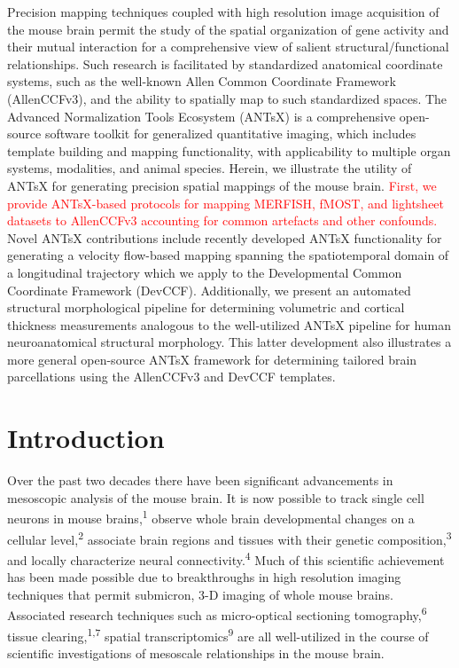 \documentclass[
  12pt,
]{article}
\begin{document}
Precision mapping techniques coupled with high resolution image
acquisition of the mouse brain permit the study of the spatial
organization of gene activity and their mutual interaction for a
comprehensive view of salient structural/functional relationships. Such
research is facilitated by standardized anatomical coordinate systems,
such as the well-known Allen Common Coordinate Framework (AllenCCFv3),
and the ability to spatially map to such standardized spaces. The
Advanced Normalization Tools Ecosystem (ANTsX) is a comprehensive
open-source software toolkit for generalized quantitative imaging, which
includes template building and mapping functionality, with applicability
to multiple organ systems, modalities, and animal species. Herein, we
illustrate the utility of ANTsX for generating precision spatial
mappings of the mouse brain.
\textcolor{red}{First, we provide ANTsX-based protocols for mapping
MERFISH, fMOST, and lightsheet datasets to AllenCCFv3 accounting for common
artefacts and other confounds.} Novel ANTsX contributions include
recently developed ANTsX functionality for generating a velocity
flow-based mapping spanning the spatiotemporal domain of a longitudinal
trajectory which we apply to the Developmental Common Coordinate
Framework (DevCCF). Additionally, we present an automated structural
morphological pipeline for determining volumetric and cortical thickness
measurements analogous to the well-utilized ANTsX pipeline for human
neuroanatomical structural morphology. This latter development also
illustrates a more general open-source ANTsX framework for determining
tailored brain parcellations using the AllenCCFv3 and DevCCF templates.

\clearpage

\hypertarget{introduction}{%
\section{Introduction}\label{introduction}}

Over the past two decades there have been significant advancements in
mesoscopic analysis of the mouse brain. It is now possible to track
single cell neurons in mouse brains,\textsuperscript{1} observe whole
brain developmental changes on a cellular level,\textsuperscript{2}
associate brain regions and tissues with their genetic
composition,\textsuperscript{3} and locally characterize neural
connectivity.\textsuperscript{4} Much of this scientific achievement has
been made possible due to breakthroughs in high resolution imaging
techniques that permit submicron, 3-D imaging of whole mouse brains.
Associated research techniques such as micro-optical sectioning
tomography,\textsuperscript{6} tissue clearing,\textsuperscript{1,7}
spatial transcriptomics\textsuperscript{9} are all well-utilized in the
course of scientific investigations of mesoscale relationships in the
mouse brain.
\end{document}

